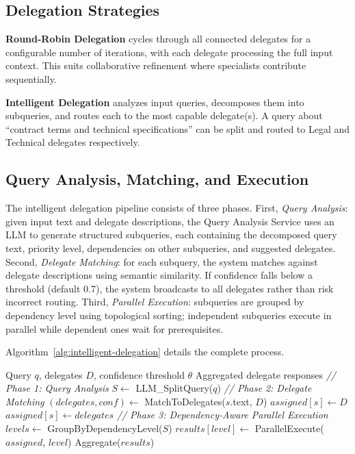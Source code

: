 \documentclass[11pt]{article}
\begin{document}
\subsection{Delegation Strategies}

\textbf{Round-Robin Delegation} cycles through all connected delegates for a configurable number of iterations, with each delegate processing the full input context. This suits collaborative refinement where specialists contribute sequentially.

\textbf{Intelligent Delegation} analyzes input queries, decomposes them into subqueries, and routes each to the most capable delegate(s). A query about ``contract terms and technical specifications'' can be split and routed to Legal and Technical delegates respectively.

\subsection{Query Analysis, Matching, and Execution}

The intelligent delegation pipeline consists of three phases. First, \textit{Query Analysis}: given input text and delegate descriptions, the Query Analysis Service uses an LLM to generate structured subqueries, each containing the decomposed query text, priority level, dependencies on other subqueries, and suggested delegates. Second, \textit{Delegate Matching}: for each subquery, the system matches against delegate descriptions using semantic similarity. If confidence falls below a threshold (default 0.7), the system broadcasts to all delegates rather than risk incorrect routing. Third, \textit{Parallel Execution}: subqueries are grouped by dependency level using topological sorting; independent subqueries execute in parallel while dependent ones wait for prerequisites.

Algorithm~\ref{alg:intelligent-delegation} details the complete process.

\begin{algorithm}[t]
\caption{Intelligent Delegation}
\label{alg:intelligent-delegation}
\begin{algorithmic}[1]
\REQUIRE Query $q$, delegates $D$, confidence threshold $\theta$
\ENSURE Aggregated delegate responses
\STATE \textit{// Phase 1: Query Analysis}
\STATE $S \leftarrow$ LLM\_SplitQuery($q$)
\STATE {}
\STATE
\STATE \textit{// Phase 2: Delegate Matching}
    \STATE $(delegates, conf) \leftarrow$ MatchToDelegates($s$.text, $D$)
        \STATE $assigned[s] \leftarrow D$ 
    \ELSE
        \STATE $assigned[s] \leftarrow delegates$
    \ENDIF
\ENDFOR
\STATE
\STATE \textit{// Phase 3: Dependency-Aware Parallel Execution}
\STATE $levels \leftarrow$ GroupByDependencyLevel($S$)
    \STATE $results[level] \leftarrow$ ParallelExecute($assigned$, $level$)
\ENDFOR
\RETURN Aggregate($results$)
\end{algorithmic}
\end{algorithm}
\end{document}
